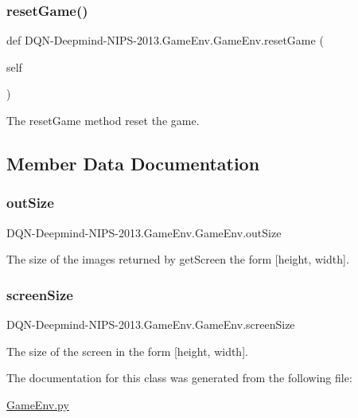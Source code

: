 \subsubsection{\texorpdfstring{reset\+Game()}{resetGame()}}
{\footnotesize\ttfamily def D\+QN-\/Deepmind-\/N\+I\+PS-\/2013.Game\+Env.\+Game\+Env.\+reset\+Game (\begin{DoxyParamCaption}\item[{}]{self }\end{DoxyParamCaption})}



The reset\+Game method reset the game. 



\subsection{Member Data Documentation}
\hypertarget{classDQN-Deepmind-NIPS-2013_1_1GameEnv_1_1GameEnv_ae8e7e56bd996ea0ce4ece1ca32f6b54a}{}\label{classDQN-Deepmind-NIPS-2013_1_1GameEnv_1_1GameEnv_ae8e7e56bd996ea0ce4ece1ca32f6b54a} 
\subsubsection{\texorpdfstring{out\+Size}{outSize}}
{\footnotesize\ttfamily D\+QN-\/Deepmind-\/N\+I\+PS-\/2013.Game\+Env.\+Game\+Env.\+out\+Size}



The size of the images returned by get\+Screen the form \mbox{[}height, width\mbox{]}. 

\hypertarget{classDQN-Deepmind-NIPS-2013_1_1GameEnv_1_1GameEnv_a2dedb2f4e5f0f1b7da2970ac89a5b544}{}\label{classDQN-Deepmind-NIPS-2013_1_1GameEnv_1_1GameEnv_a2dedb2f4e5f0f1b7da2970ac89a5b544} 
\subsubsection{\texorpdfstring{screen\+Size}{screenSize}}
{\footnotesize\ttfamily D\+QN-\/Deepmind-\/N\+I\+PS-\/2013.Game\+Env.\+Game\+Env.\+screen\+Size}



The size of the screen in the form \mbox{[}height, width\mbox{]}. 



The documentation for this class was generated from the following file\+:\begin{DoxyCompactItemize}
\item 
\hyperlink{GameEnv_8py}{Game\+Env.\+py}\end{DoxyCompactItemize}
